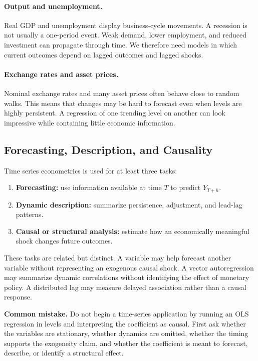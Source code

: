 \paragraph{Output and unemployment.}
Real GDP and unemployment display business-cycle movements. A recession is not usually a one-period event. Weak demand, lower employment, and reduced investment can propagate through time. We therefore need models in which current outcomes depend on lagged outcomes and lagged shocks.

\paragraph{Exchange rates and asset prices.}
Nominal exchange rates and many asset prices often behave close to random walks. This means that changes may be hard to forecast even when levels are highly persistent. A regression of one trending level on another can look impressive while containing little economic information.

\subsection{Forecasting, Description, and Causality}
Time series econometrics is used for at least three tasks:
\begin{enumerate}
\item \textbf{Forecasting:} use information available at time $T$ to predict $Y_{T+h}$.
\item \textbf{Dynamic description:} summarize persistence, adjustment, and lead-lag patterns.
\item \textbf{Causal or structural analysis:} estimate how an economically meaningful shock changes future outcomes.
\end{enumerate}

These tasks are related but distinct. A variable may help forecast another variable without representing an exogenous causal shock. A vector autoregression may summarize dynamic correlations without identifying the effect of monetary policy. A distributed lag may measure delayed association rather than a causal response.

\begin{boxF}
\textbf{Common mistake.}
Do not begin a time-series application by running an OLS regression in levels and interpreting the coefficient as causal. First ask whether the variables are stationary, whether dynamics are omitted, whether the timing supports the exogeneity claim, and whether the coefficient is meant to forecast, describe, or identify a structural effect.
\end{boxF}

